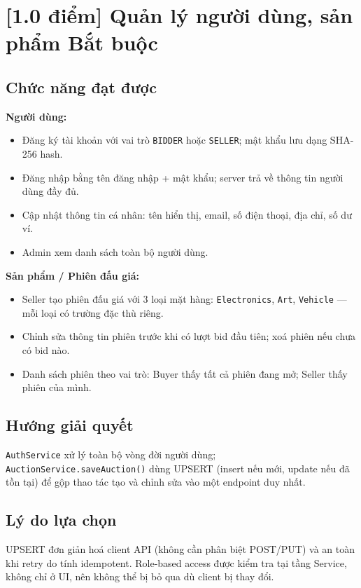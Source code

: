 \documentclass[12pt,a4paper]{article}
\newcommand{\score}[1]{\textbf{[#1 điểm]}}
\newcommand{\mandatory}{\textcolor{mandatorycolor}{\textbf{Bắt buộc}}}
\newcommand{\filepath}[1]{\texttt{\small #1}}
\begin{document}
\section{\score{1.0} Quản lý người dùng, sản phẩm \hfill \mandatory}

\subsection*{Chức năng đạt được}

\textbf{Người dùng:}
\begin{itemize}[leftmargin=1.5em]
  \item Đăng ký tài khoản với vai trò \texttt{BIDDER} hoặc \texttt{SELLER}; mật khẩu lưu dạng SHA-256 hash.
  \item Đăng nhập bằng tên đăng nhập + mật khẩu; server trả về thông tin người dùng đầy đủ.
  \item Cập nhật thông tin cá nhân: tên hiển thị, email, số điện thoại, địa chỉ, số dư ví.
  \item Admin xem danh sách toàn bộ người dùng.
\end{itemize}

\textbf{Sản phẩm / Phiên đấu giá:}
\begin{itemize}[leftmargin=1.5em]
  \item Seller tạo phiên đấu giá với 3 loại mặt hàng: \texttt{Electronics}, \texttt{Art}, \texttt{Vehicle} — mỗi loại có trường đặc thù riêng.
  \item Chỉnh sửa thông tin phiên trước khi có lượt bid đầu tiên; xoá phiên nếu chưa có bid nào.
  \item Danh sách phiên theo vai trò: Buyer thấy tất cả phiên đang mở; Seller thấy phiên của mình.
\end{itemize}

\subsection*{Hướng giải quyết}
\filepath{AuthService} xử lý toàn bộ vòng đời người dùng; \filepath{AuctionService.saveAuction()} dùng UPSERT (insert nếu mới, update nếu đã tồn tại) để gộp thao tác tạo và chỉnh sửa vào một endpoint duy nhất.

\subsection*{Lý do lựa chọn}
UPSERT đơn giản hoá client API (không cần phân biệt POST/PUT) và an toàn khi retry do tính idempotent. Role-based access được kiểm tra tại tầng Service, không chỉ ở UI, nên không thể bị bỏ qua dù client bị thay đổi.
\end{document}
